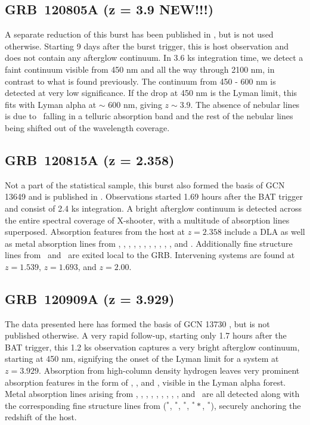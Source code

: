 \documentclass{aa}    %
\begin{document}
\subsection{GRB~120805A (z = 3.9 NEW!!!)} \label{120805}

A separate reduction of this burst has been published in \citet{Kruhler2015},
but is not used otherwise. Starting 9 days after the burst trigger, this is host
observation and does not contain any afterglow continuum. In 3.6 ks integration
time, we detect a faint continuum visible from 450 nm and all the way through
2100 nm, in contrast to what is found previously. The continuum from 450 - 600
nm is detected at very low significance. If the drop at 450 nm is the Lyman
limit, this fits with Lyman alpha at $\sim$ 600 nm, giving $z \sim 3.9$. The
absence of nebular lines is due to \oii~falling in a telluric absorption band
and the rest of the nebular lines being shifted out of the wavelength coverage.

\subsection{GRB~120815A (z = 2.358)} \label{120815}

Not a part of the statistical sample, this burst also formed the basis of  GCN
13649 \citep{GCN13649} and is published in \citet{Kruhler2013}. Observations
started 1.69 hours after the BAT trigger and consist of 2.4 ks integration. A
bright afterglow continuum is detected across the entire spectral coverage of
X-shooter, with a multitude of absorption lines superposed. Absorption features
from the host at $z = 2.358$ include a DLA as well as metal absorption lines
from \nv, \sii, \SIii, \oi, \civ, \SIiv, \feii, \alii, \aliii, \mnii, \mgii, and
\mgi. Additionally fine structure lines from \NIii~and \feii~are exited local to
the GRB. Intervening systems are found at $z = 1.539$, $z = 1.693$, and $z =
2.00$.

\subsection{GRB~120909A (z = 3.929)} \label{120909}

The data presented here has formed the basis of GCN 13730 \citep{GCN13730}, but
is not published otherwise. A very rapid follow-up, starting only 1.7 hours
after the BAT trigger, this 1.2 ks observation captures a very bright afterglow
continuum, starting at 450 nm, signifying the onset of the Lyman limit for a
system at $z = 3.929$. Absorption from high-column density hydrogen leaves very
prominent absorption features in the form of \lya, \lyb, and \lyg, visible in
the Lyman alpha forest. Metal absorption lines arising from \feii, \NIii, \SIii,
\sii, \alii, \aliii, \cii, \oi, \civ, and \znii~are all detected along with the
corresponding fine structure lines from (\feii$^*$, \SIii$^*$, \oi$^*$,
\oi$^**$, \cii$^*$), securely anchoring the redshift of the host.
\end{document}
